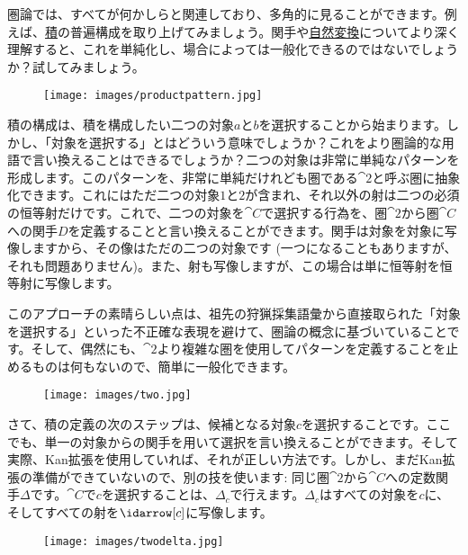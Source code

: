 
\lettrine[lhang=0.17]{圏}{論}では、すべてが何かしらと関連しており、多角的に見ることができます。例えば、\hyperref[products-and-coproducts]{積}の普遍構成を取り上げてみましょう。関手や\hyperref[natural-transformations]{自然変換}についてより深く理解すると、これを単純化し、場合によっては一般化できるのではないでしょうか？試してみましょう。

\begin{figure}[H]
  \centering
  \texttt{[image: images/productpattern.jpg]}
\end{figure}

\noindent
積の構成は、積を構成したい二つの対象$a$と$b$を選択することから始まります。しかし、「対象を選択する」とはどういう意味でしょうか？これをより圏論的な用語で言い換えることはできるでしょうか？二つの対象は非常に単純なパターンを形成します。このパターンを、非常に単純だけれども圏である$\cat{2}$と呼ぶ圏に抽象化できます。これにはただ二つの対象$1$と$2$が含まれ、それ以外の射は二つの必須の恒等射だけです。これで、二つの対象を$\cat{C}$で選択する行為を、圏$\cat{2}$から圏$\cat{C}$への関手$D$を定義することと言い換えることができます。関手は対象を対象に写像しますから、その像はただの二つの対象です (一つになることもありますが、それも問題ありません)。また、射も写像しますが、この場合は単に恒等射を恒等射に写像します。

このアプローチの素晴らしい点は、祖先の狩猟採集語彙から直接取られた「対象を選択する」といった不正確な表現を避けて、圏論の概念に基づいていることです。そして、偶然にも、$\cat{2}$より複雑な圏を使用してパターンを定義することを止めるものは何もないので、簡単に一般化できます。

\begin{figure}[H]
  \centering
  \texttt{[image: images/two.jpg]}
\end{figure}

\noindent
さて、積の定義の次のステップは、候補となる対象$c$を選択することです。ここでも、単一の対象からの関手を用いて選択を言い換えることができます。そして実際、Kan拡張を使用していれば、それが正しい方法です。しかし、まだKan拡張の準備ができていないので、別の技を使います: 同じ圏$\cat{2}$から$\cat{C}$への定数関手$\Delta$です。$\cat{C}$で$c$を選択することは、$\Delta_c$で行えます。$\Delta_c$はすべての対象を$c$に、そしてすべての射を$\idarrow[c]$に写像します。

\begin{figure}[H]
  \centering
  \texttt{[image: images/twodelta.jpg]}
\end{figure}

